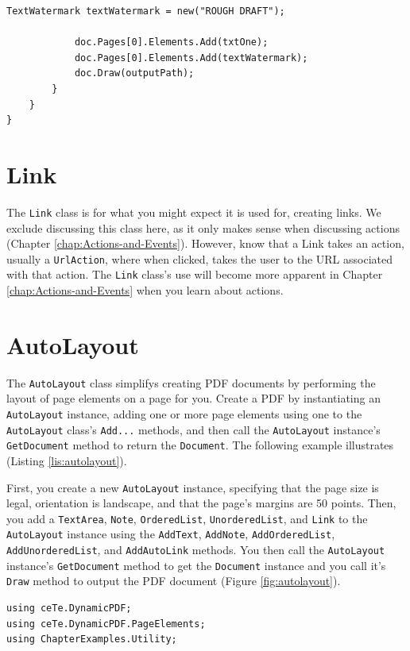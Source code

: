 \documentclass[american]{tufte-book}
\numberwithin{equation}{section}
\numberwithin{figure}{section}
\begin{document}
{{\begin{lstlisting}[caption={Adding a text watermark to a PDF document.},label={lis:watermark-Adding-a-text},basicstyle={\footnotesize\ttfamily},breaklines=true]
            TextWatermark textWatermark = new("ROUGH DRAFT");

            doc.Pages[0].Elements.Add(txtOne);
            doc.Pages[0].Elements.Add(textWatermark);
            doc.Draw(outputPath);
        }
    }
}
\end{lstlisting}
\leavevmode\egroup

\section{Link}

The \texttt{Link} class is for what you might expect
it is used for, creating links. We exclude discussing this class here,
as it only makes sense when discussing actions (Chapter \ref{chap:Actions-and-Events}).
However, know that a Link takes an action, usually a \texttt{UrlAction},
where when clicked, takes the user to the URL associated with that
action. The \texttt{Link} class's use will become more
apparent in Chapter \ref{chap:Actions-and-Events} when you learn
about actions.

\section{AutoLayout}
\label{sec:autolayout}
The \texttt{AutoLayout} class simplifys creating PDF documents by performing the layout of page elements on a page for you. Create a PDF by instantiating an \texttt{AutoLayout} instance, adding one or more page elements using one to the \texttt{AutoLayout} class's \texttt{Add...} methods, and then call the \texttt{AutoLayout} instance's \texttt{GetDocument} method to return the \texttt{Document}. The following example illustrates (Listing \ref{lis:autolayout}).

First, you create a new \texttt{AutoLayout} instance, specifying that the page size is legal, orientation is landscape, and that the page's margins are 50 points.  Then, you add a \texttt{TextArea}, \texttt{Note}, \texttt{OrderedList}, \texttt{UnorderedList}, and \texttt{Link} to the \texttt{AutoLayout} instance using the \texttt{AddText}, \texttt{AddNote}, \texttt{AddOrderedList}, \texttt{AddUnorderedList}, and \texttt{AddAutoLink} methods. You then call the \texttt{AutoLayout} instance's \texttt{GetDocument} method to get the \texttt{Document} instance and you call it's \texttt{Draw} method to output the PDF document (Figure \ref{fig:autolayout}). 

\bgroup{}
\begin{lstlisting}[caption={Using AutoLayout to create a PDF document.},label={lis:autolayout},basicstyle={\footnotesize\ttfamily},breaklines=true]
using ceTe.DynamicPDF;
using ceTe.DynamicPDF.PageElements;
using ChapterExamples.Utility;


\end{lstlisting}}}
\end{document}
